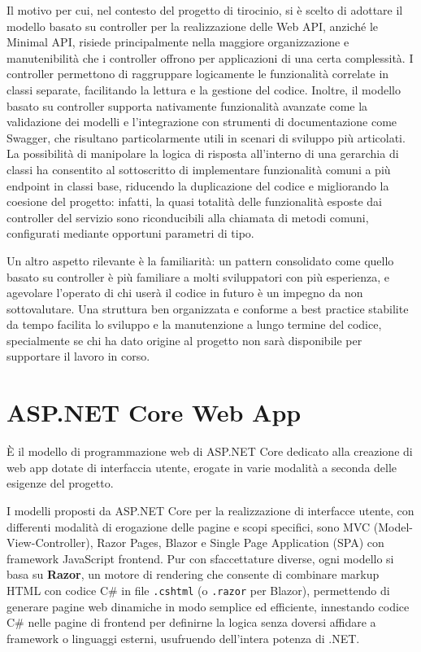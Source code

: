Il motivo per cui, nel contesto del progetto di tirocinio, si è scelto di adottare il modello basato su controller per la realizzazione delle Web API, anziché le Minimal API, risiede principalmente nella maggiore organizzazione e manutenibilità che i controller offrono per applicazioni di una certa complessità. I controller permettono di raggruppare logicamente le funzionalità correlate in classi separate, facilitando la lettura e la gestione del codice. Inoltre, il modello basato su controller supporta nativamente funzionalità avanzate come la validazione dei modelli e l'integrazione con strumenti di documentazione come Swagger, che risultano particolarmente utili in scenari di sviluppo più articolati. La possibilità di manipolare la logica di risposta all'interno di una gerarchia di classi ha consentito al sottoscritto di implementare funzionalità comuni a più endpoint in classi base, riducendo la duplicazione del codice e migliorando la coesione del progetto: infatti, la quasi totalità delle funzionalità esposte dai controller del servizio sono riconducibili alla chiamata di metodi comuni, configurati mediante opportuni parametri di tipo.

Un altro aspetto rilevante è la familiarità: un pattern consolidato come quello basato su controller è più familiare a molti sviluppatori con più esperienza, e agevolare l'operato di chi userà il codice in futuro è un impegno da non sottovalutare. Una struttura ben organizzata e conforme a best practice stabilite da tempo facilita lo sviluppo e la manutenzione a lungo termine del codice, specialmente se chi ha dato origine al progetto non sarà disponibile per supportare il lavoro in corso.

\section{ASP.NET Core Web App}
È il modello di programmazione web di ASP.NET Core dedicato alla creazione di web app dotate di interfaccia utente, erogate in varie modalità a seconda delle esigenze del progetto.

I modelli proposti da ASP.NET Core per la realizzazione di interfacce utente, con differenti modalità di erogazione delle pagine e scopi specifici, sono MVC (Model-View-Controller), Razor Pages, Blazor e Single Page Application (SPA) con framework JavaScript frontend.
Pur con sfaccettature diverse, ogni modello si basa su \textbf{Razor}, un motore di rendering che consente di combinare markup HTML con codice C\# in file \texttt{.cshtml} (o \texttt{.razor} per Blazor), permettendo di generare pagine web dinamiche in modo semplice ed efficiente, innestando codice C\# nelle pagine di frontend per definirne la logica senza doversi affidare a framework o linguaggi esterni, usufruendo dell'intera potenza di .NET.

